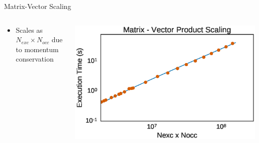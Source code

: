 \documentclass[10pt]{beamer}
\begin{document}
{{{{{{{{{{{{{{{{{\begin{frame}{Matrix-Vector Scaling}
	\begin{columns}[c] %
		\begin{column}{.4\textwidth}
			\begin{itemize}
				\item {Scales as $N_{exc} \times  N_{occ}$ due to momentum conservation}
			\end{itemize}				
		\end{column}
		\hfill
		\begin{column}{0.6\textwidth}
		    \begin{overprint}
			    \includegraphics[width=\linewidth]{../images/mvscaling.eps}

			\end{overprint}
		\end{column}	
	\end{columns}
\end{frame}

{%

}}}}}}}}}}}}}}}}}}
\end{document}
